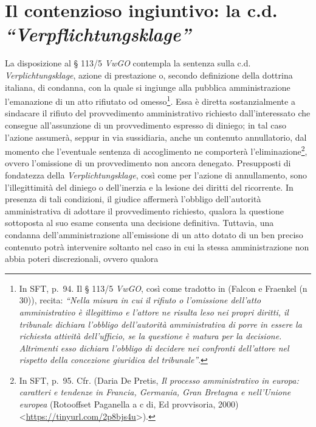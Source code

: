 \documentclass[12pt,it,a4paper,]{report}
\begin{document}
\hypertarget{il-contenzioso-ingiuntivo-la-c.d.-verpflichtungsklage}{%
\section{\texorpdfstring{Il contenzioso ingiuntivo: la c.d.
\emph{``Verpflichtungsklage''}}{Il contenzioso ingiuntivo: la c.d. ``Verpflichtungsklage''}}\label{il-contenzioso-ingiuntivo-la-c.d.-verpflichtungsklage}}

La disposizione al § 113/5 \emph{VwGO} contempla la sentenza sulla c.d.
\emph{Verplichtungsklage}, azione di prestazione o, secondo definizione
della dottrina italiana, di condanna, con la quale si ingiunge alla
pubblica amministrazione l'emanazione di un atto rifiutato od
omesso\footnote{In SFT, p.~94. Il § 113/5 \emph{VwGO}, così come
  tradotto in (Falcon e Fraenkel (n 30)), recita: \emph{``Nella misura
  in cui il rifiuto o l'omissione dell'atto amministrativo è illegittimo
  e l'attore ne risulta leso nei propri diritti, il tribunale dichiara
  l'obbligo dell'autorità amministrativa di porre in essere la richiesta
  attività dell'ufficio, se la questione è matura per la decisione.
  Altrimenti esso dichiara l'obbligo di decidere nei confronti
  dell'attore nel rispetto della concezione giuridica del tribunale''}.}.
Essa è diretta sostanzialmente a sindacare il rifiuto del provvedimento
amministrativo richiesto dall'interessato che consegue all'assunzione di
un provvedimento espresso di diniego; in tal caso l'azione assumerà,
seppur in via sussidiaria, anche un contenuto annullatorio, dal momento
che l'eventuale sentenza di accoglimento ne comporterà
l'eliminazione\footnote{In SFT, p.~95. Cfr. (Daria De Pretis, \emph{Il
  processo amministrativo in europa: caratteri e tendenze in Francia,
  Germania, Gran Bretagna e nell'Unione europea} (Rotooffset Paganella a
  c di, Ed provvisoria, 2000)
  \textless{}\url{https://tinyurl.com/2p8bjs4u}\textgreater{}).}, ovvero
l'omissione di un provvedimento non ancora denegato. Presupposti di
fondatezza della \emph{Verplichtungsklage}, così come per l'azione di
annullamento, sono l'illegittimità del diniego o dell'inerzia e la
lesione dei diritti del ricorrente. In presenza di tali condizioni, il
giudice affermerà l'obbligo dell'autorità amministrativa di adottare il
provvedimento richiesto, qualora la questione sottoposta al suo esame
consenta una decisione definitiva. Tuttavia, una condanna
dell'amministrazione all'emissione di un atto dotato di un ben preciso
contenuto potrà intervenire soltanto nel caso in cui la stessa
amministrazione non abbia poteri discrezionali, ovvero qualora
\end{document}
